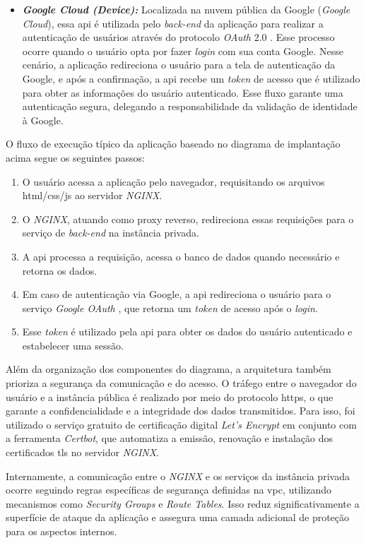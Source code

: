 \begin{itemize}
  \item \textbf{\textit{Google Cloud (Device):}} Localizada na nuvem pública da Google (\textit{Google Cloud}), essa \gls{api} é utilizada pelo \emph{back-end} da aplicação para realizar a autenticação de usuários através do protocolo \emph{OAuth} 2.0 \cite{GoogleOAuth}. Esse processo ocorre quando o usuário opta por fazer \emph{login} com sua conta Google. Nesse cenário, a aplicação redireciona o usuário para a tela de autenticação da Google, e após a confirmação, a \gls{api} recebe um \textit{token} de acesso que é utilizado para obter as informações do usuário autenticado. Esse fluxo garante uma autenticação segura, delegando a responsabilidade da validação de identidade à Google.
\end{itemize}

O fluxo de execução típico da aplicação baseado no diagrama de implantação acima segue os seguintes passos:
\begin{enumerate}
  \item O usuário acessa a aplicação pelo navegador, requisitando os arquivos \gls{html}/\gls{css}/\gls{js} ao servidor \emph{NGINX}.
  \item O \emph{NGINX}, atuando como proxy reverso, redireciona essas requisições para o serviço de \emph{back-end} na instância privada.
  \item A \gls{api} processa a requisição, acessa o banco de dados quando necessário e retorna os dados.
  \item Em caso de autenticação via Google, a \gls{api} redireciona o usuário para o serviço \emph{Google OAuth} \cite{GoogleOAuth}, que retorna um \emph{token} de acesso após o \emph{login}.
  \item Esse \emph{token} é utilizado pela \gls{api} para obter os dados do usuário autenticado e estabelecer uma sessão.
\end{enumerate}

Além da organização dos componentes do diagrama, a arquitetura também prioriza a segurança da comunicação e do acesso. O tráfego entre o navegador do usuário e a instância pública é realizado por meio do protocolo \gls{https}, o que garante a confidencialidade e a integridade dos dados transmitidos. Para isso, foi utilizado o serviço gratuito de certificação digital \emph{Let's Encrypt} em conjunto com a ferramenta \emph{Certbot}, que automatiza a emissão, renovação e instalação dos certificados \gls{tls} no servidor \emph{NGINX}.

Internamente, a comunicação entre o \emph{NGINX} e os serviços da instância privada ocorre seguindo regras específicas de segurança definidas na \gls{vpc}, utilizando mecanismos como \textit{Security Groups} e \textit{Route Tables}. Isso reduz significativamente a superfície de ataque da aplicação e assegura uma camada adicional de proteção para os aspectos internos.

